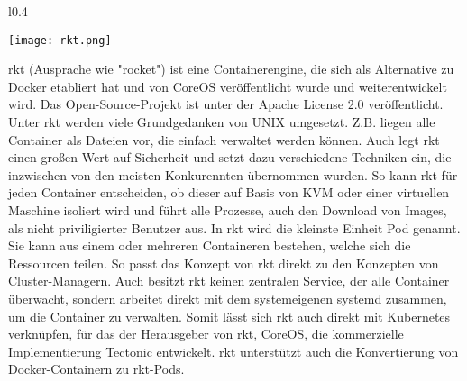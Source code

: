 \begin{wrapfigure}{l}{0.4\textwidth}
	\vspace{-40pt}
	\begin{center}
		\texttt{[image: rkt.png]}
	\end{center}
	\vspace{-15pt}
	\caption[Logo rkt]{ \footnotemark}
	\label{fig:rkt}
	\vspace{-30pt}
\end{wrapfigure}


rkt (Ausprache wie "rocket") ist eine Containerengine, die sich als Alternative zu Docker etabliert hat und von CoreOS veröffentlicht wurde und weiterentwickelt wird. Das Open-Source-Projekt ist unter der Apache License 2.0 veröffentlicht. \citep{RepoRkt} Unter rkt werden viele Grundgedanken von UNIX umgesetzt. Z.B. liegen alle Container als Dateien vor, die einfach verwaltet werden können. Auch legt rkt einen großen Wert auf Sicherheit und setzt dazu verschiedene Techniken ein, die inzwischen von den meisten Konkurennten übernommen wurden. So kann rkt für jeden Container entscheiden, ob dieser auf Basis von KVM oder einer virtuellen Maschine isoliert wird und führt alle Prozesse, auch den Download von Images, als nicht priviligierter Benutzer aus. In rkt wird die kleinste Einheit Pod genannt. Sie kann aus einem oder mehreren Containeren bestehen, welche sich die Ressourcen teilen. So passt das Konzept von  rkt direkt zu den Konzepten von  Cluster-Managern. Auch besitzt rkt keinen zentralen Service, der alle Container überwacht, sondern arbeitet direkt mit dem systemeigenen systemd zusammen, um die Container zu verwalten. Somit lässt sich rkt auch direkt mit Kubernetes verknüpfen, für das der Herausgeber von rkt, CoreOS, die kommerzielle Implementierung Tectonic entwickelt. rkt unterstützt auch die Konvertierung von Docker-Containern zu rkt-Pods. \citep{HomepageRkt,ixrkt}

